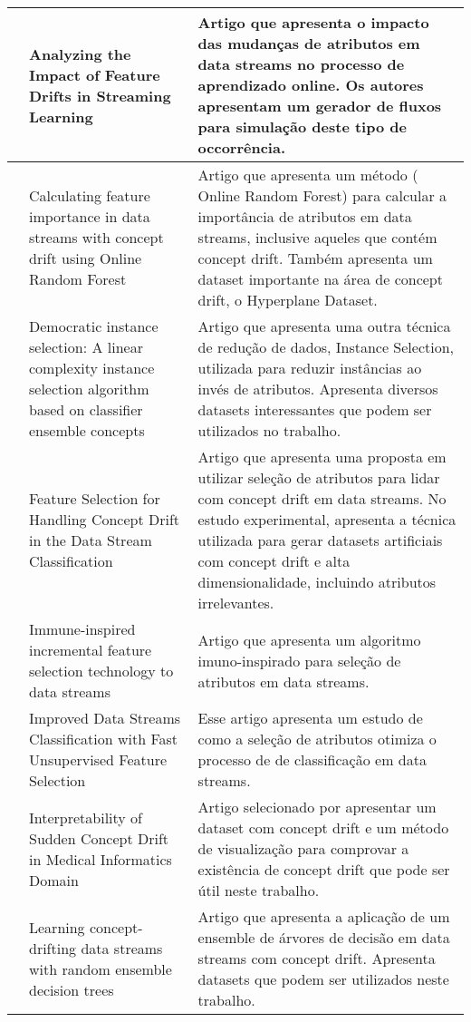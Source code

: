 \begin{longtable}[c]{|p{2.7cm}|p{5cm}|p{7cm}|}
\\ \hline
\cite{Barddal2015} & Analyzing the Impact of Feature Drifts in Streaming Learning & Artigo que apresenta o impacto das mudanças de atributos em data streams no processo de aprendizado online. Os autores apresentam um gerador de fluxos para simulação deste tipo de occorrência.
\\ \hline
\cite{Cassidy2014} & Calculating feature importance in data streams with concept drift using Online Random Forest & Artigo que apresenta um método ( Online Random Forest) para calcular a importância de atributos em data streams, inclusive aqueles que contém concept drift. Também apresenta um dataset importante na área de concept drift, o Hyperplane Dataset.
\\ \hline
\cite{Garcia-Osorio2010} & Democratic instance selection: A linear complexity instance selection algorithm based on classifier ensemble concepts & Artigo que apresenta uma outra técnica de redução de dados, Instance Selection, utilizada para reduzir instâncias ao invés de atributos. Apresenta diversos datasets interessantes que podem ser utilizados no trabalho.
\\ \hline
\cite{Turkov2016} & Feature Selection for Handling Concept Drift in the Data Stream Classification & Artigo que apresenta uma proposta em utilizar seleção de atributos para lidar com concept drift em data streams. No estudo experimental, apresenta a técnica utilizada para gerar datasets artificiais com concept drift e alta dimensionalidade, incluindo atributos irrelevantes.
\\ \hline
\cite{Yue2008} & Immune-inspired incremental feature selection technology to data streams & Artigo que apresenta um algoritmo imuno-inspirado para seleção de atributos em data streams.
\\ \hline
\cite{Wang2016} & Improved Data Streams Classification with Fast Unsupervised Feature Selection & Esse artigo apresenta um estudo de como a seleção de atributos otimiza o processo de de classificação em data streams.
\\ \hline
\cite{Stiglic2011} & Interpretability of Sudden Concept Drift in Medical Informatics Domain & Artigo selecionado por apresentar um dataset com concept drift e um método de visualização para comprovar a existência de concept drift que pode ser útil neste trabalho.
\\ \hline
\cite{Li2015} & Learning concept-drifting data streams with random ensemble decision trees & Artigo que apresenta a aplicação de um ensemble de árvores de decisão em data streams com concept drift. Apresenta datasets que podem ser utilizados neste trabalho.

\end{longtable}
